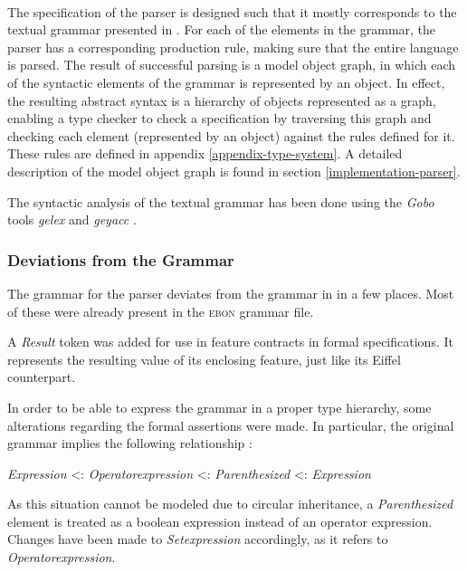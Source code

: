 \paragraph{}
The specification of the parser is designed such that it mostly corresponds to the textual \bon{} grammar presented in \cite{walden1995}. For each of the elements in the grammar, the parser has a corresponding production rule, making sure that the entire language is parsed. The result of successful parsing is a model object graph, in which each of the syntactic elements of the grammar is represented by an object. In effect, the resulting abstract syntax is a hierarchy of objects represented as a graph, enabling a type checker to check a \bon{} specification by traversing this graph and checking each element (represented by an object) against the rules defined for it. These rules are defined in appendix \ref{appendix-type-system}. A detailed description of the model object graph is found in section \ref{implementation-parser}.

The syntactic analysis of the textual \bon{} grammar has been done using the \textit{Gobo} tools \textit{gelex} and \textit{geyacc} \cite{gobo}.
\subsubsection{Deviations from the Grammar}
\label{design-grammar-deviations}
The grammar for the parser deviates from the grammar in \cite{walden1995} in a few places. Most of these were already present in the \textsc{ebon} grammar file.

A \textit{Result} token was added for use in feature contracts in formal specifications. It represents the resulting value of its enclosing feature, just like its Eiffel counterpart.

In order to be able to express the grammar in a proper type hierarchy, some alterations regarding the formal assertions were made. In particular, the original grammar implies the following relationship \cite[p.~357]{walden1995}:
\begin{center}
\textit{Expression} \textless : \textit{Operator\textunderscore expression} \textless : \textit{Parenthesized} \textless : \textit{Expression}
\end{center}
As this situation cannot be modeled due to circular inheritance, a \textit{Parenthesized} element is treated as a boolean expression instead of an operator expression. Changes have been made to \textit{Set\textunderscore expression} accordingly, as it refers to \textit{Operator\textunderscore expression}.

